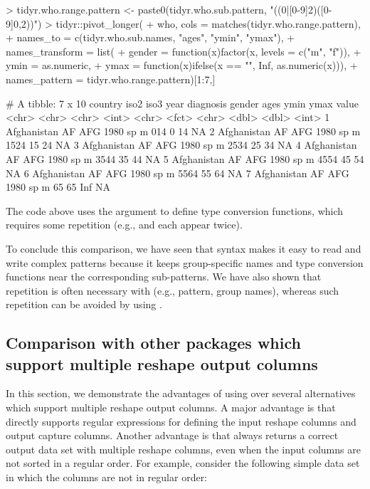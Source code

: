 \begin{Schunk}
\begin{Sinput}
> tidyr.who.range.pattern <- paste0(tidyr.who.sub.pattern, "((0|[0-9]{2})([0-9]{0,2}))")
> tidyr::pivot_longer(
+   who, cols = matches(tidyr.who.range.pattern),
+   names_to = c(tidyr.who.sub.names, "ages", "ymin", "ymax"),
+   names_transform = list(
+     gender = function(x)factor(x, levels = c("m", "f")),
+     ymin = as.numeric,
+     ymax = function(x)ifelse(x == "", Inf, as.numeric(x))),
+   names_pattern = tidyr.who.range.pattern)[1:7,]
\end{Sinput}
\begin{Soutput}
# A tibble: 7 x 10
  country     iso2  iso3   year diagnosis gender ages   ymin  ymax value
  <chr>       <chr> <chr> <int> <chr>     <fct>  <chr> <dbl> <dbl> <int>
1 Afghanistan AF    AFG    1980 sp        m      014       0    14    NA
2 Afghanistan AF    AFG    1980 sp        m      1524     15    24    NA
3 Afghanistan AF    AFG    1980 sp        m      2534     25    34    NA
4 Afghanistan AF    AFG    1980 sp        m      3544     35    44    NA
5 Afghanistan AF    AFG    1980 sp        m      4554     45    54    NA
6 Afghanistan AF    AFG    1980 sp        m      5564     55    64    NA
7 Afghanistan AF    AFG    1980 sp        m      65       65   Inf    NA
\end{Soutput}
\end{Schunk}

The code above uses the  argument to define
type conversion functions, which requires some repetition (e.g.,
 and  each appear twice).

To conclude this comparison, we have seen that  syntax makes
it easy to read and write complex patterns because it keeps
group-specific names and type conversion functions near the
corresponding sub-patterns. We have also shown that repetition is
often necessary with  (e.g., pattern, group names), whereas
such repetition can be avoided by using .

\subsection{Comparison with other packages which support multiple reshape output columns}

In this section, we demonstrate the advantages of using  over
several alternatives which support multiple reshape output columns. A
major advantage is that  directly supports regular expressions
for defining the input reshape columns and output capture
columns. Another advantage is that  always returns a correct
output data set with multiple reshape columns, even when the input
columns are not sorted in a regular order. For example, consider the
following simple data set in which the columns are not in regular
order:

